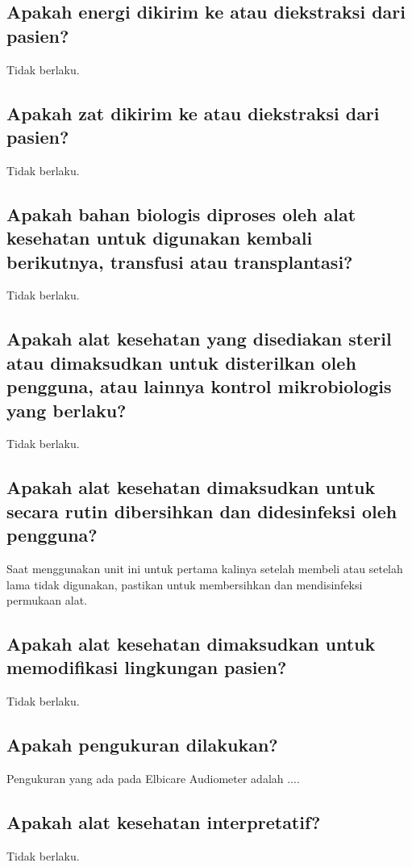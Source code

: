 \documentclass[11pt,a4paper,twoside,draft,onecolumn]{book}
\begin{document}
			\subsection{Apakah energi dikirim ke atau diekstraksi dari pasien?}
			Tidak berlaku.
			
			\subsection{Apakah zat dikirim ke atau diekstraksi dari pasien?}
			Tidak berlaku.
			
			\subsection{Apakah bahan biologis diproses oleh alat kesehatan untuk digunakan kembali berikutnya, transfusi atau transplantasi?}
			Tidak berlaku.
			
			\subsection{Apakah alat kesehatan yang disediakan steril atau dimaksudkan untuk disterilkan oleh pengguna, atau lainnya kontrol mikrobiologis yang berlaku?}
			Tidak berlaku.
			
			\subsection{Apakah alat kesehatan dimaksudkan untuk secara rutin dibersihkan dan didesinfeksi oleh pengguna?}
			Saat menggunakan unit ini untuk pertama kalinya setelah membeli atau setelah lama tidak digunakan, pastikan untuk membersihkan dan mendisinfeksi permukaan alat. 
			
			\subsection{Apakah alat kesehatan dimaksudkan untuk memodifikasi lingkungan pasien?}
			Tidak berlaku.
			
			\subsection{Apakah pengukuran dilakukan?}
			Pengukuran yang ada pada Elbicare Audiometer adalah ....
			
			\subsection{Apakah alat kesehatan interpretatif?}
			Tidak berlaku.
			
\end{document}

